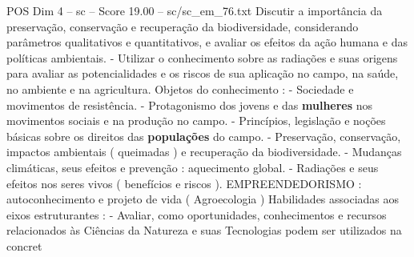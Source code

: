 \begin{textsample}{POS Dim 4 – sc – Score 19.00 – sc/sc\_em\_76.txt}
Discutir a importância da preservação, conservação e recuperação da biodiversidade, considerando parâmetros qualitativos e quantitativos, e avaliar os efeitos da ação humana e das políticas ambientais. - Utilizar o conhecimento sobre as radiações e suas origens para avaliar as potencialidades e os riscos de sua aplicação no campo, na saúde, no ambiente e na agricultura.
Objetos do conhecimento : - Sociedade e movimentos de resistência. - Protagonismo dos jovens e das \textbf{mulheres} nos movimentos sociais e na produção no campo. - Princípios, legislação e noções básicas sobre os direitos das \textbf{populações} do campo. - Preservação, conservação, impactos ambientais ( queimadas ) e recuperação da biodiversidade. - Mudanças climáticas, seus efeitos e prevenção : aquecimento global. - Radiações e seus efeitos nos seres vivos ( benefícios e riscos ).
EMPREENDEDORISMO : autoconhecimento e projeto de vida ( Agroecologia ) Habilidades associadas aos eixos estruturantes : - Avaliar, como oportunidades, conhecimentos e recursos relacionados às Ciências da Natureza e suas Tecnologias podem ser utilizados na concret

\end{textsample}
